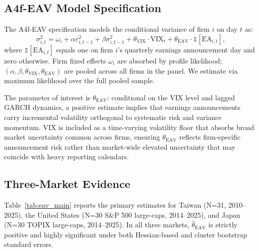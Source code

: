 \subsection{A4f-EAV Model Specification}

The A4f-EAV specification models the conditional variance of firm $i$ on day $t$ as:
\begin{equation}
\sigma_{i,t}^2 = \omega_i + \alpha \varepsilon_{i,t-1}^2 + \beta \sigma_{i,t-1}^2 + \theta_{\text{VIX}} \cdot \text{VIX}_t + \theta_{\text{EAV}} \cdot \mathbb{1}[\text{EA}_{i,t}],
\label{eq:a4f_eav}
\end{equation}
where $\mathbb{1}[\text{EA}_{i,t}]$ equals one on firm $i$'s quarterly earnings announcement day and zero otherwise. Firm fixed effects $\omega_i$ are absorbed by profile likelihood; $(\alpha, \beta, \theta_{\text{VIX}}, \theta_{\text{EAV}})$ are pooled across all firms in the panel. We estimate via maximum likelihood over the full pooled sample.

The parameter of interest is $\theta_{\text{EAV}}$: conditional on the VIX level and lagged GARCH dynamics, a positive estimate implies that earnings announcements carry incremental volatility orthogonal to systematic risk and variance momentum. VIX is included as a time-varying volatility floor that absorbs broad market uncertainty common across firms, ensuring $\theta_{\text{EAV}}$ reflects firm-specific announcement risk rather than market-wide elevated uncertainty that may coincide with heavy reporting calendars.

\subsection{Three-Market Evidence}

Table~\ref{tab:eav_main} reports the primary estimates for Taiwan (N=31, 2010--2025), the United States (N=30 S\&P 500 large-caps, 2014--2025), and Japan (N=30 TOPIX large-caps, 2014--2025). In all three markets, $\hat{\theta}_{\text{EAV}}$ is strictly positive and highly significant under both Hessian-based and cluster bootstrap standard errors.

